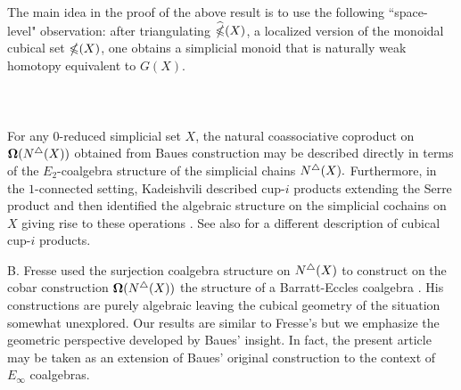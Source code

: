 

The main idea in the proof of the above result is to use the following ``space-level" observation: after triangulating $\widehat{\mathbb{\Omega}}({X})$, a localized version of the monoidal cubical set $\mathbb{\Omega}(X)$, one obtains a simplicial monoid that is naturally weak homotopy equivalent to $G(X).$ 
\\
\\
\\
\\
For any $0$-reduced simplicial set $X$, the natural coassociative coproduct on $\operatorname{\mathbf{\Omega}} (N^{\triangle} (X))$ obtained from Baues construction may be described directly in terms of the $E_2$-coalgebra structure of the simplicial chains $N^{\triangle}(X).$ Furthermore, in the $1$-connected setting, Kadeishvili described cup-$i$ products extending the Serre product and then identified the algebraic structure on the simplicial cochains on $X$ giving rise to these operations \cite{kadeishvili1999coproducts, kadeishvili2003cup-i}.
See also \cite{pilarczyk2016cubical} for a different description of cubical cup-$i$ products.

B. Fresse used the surjection coalgebra structure on $N^{\triangle}(X)$ to construct on the cobar construction $\operatorname{\mathbf{\Omega}}(N^{\triangle}(X))$ the  structure of a Barratt-Eccles coalgebra \cite{fresse2003hopf}.
His constructions are purely algebraic leaving the cubical geometry of the situation somewhat unexplored.
Our results are similar to Fresse's but we emphasize the geometric perspective developed by Baues' insight.
In fact, the present article may be taken as an extension of Baues' original construction to the context of $E_{\infty}$ coalgebras.

